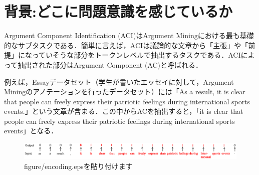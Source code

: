 \documentclass[a4j,fleqn,10pt]{jarticle}
\begin{document}
\setlength{\abovedisplayskip}{-4pt} %
\setlength{\belowdisplayskip}{2pt} %





\maketitle



\section{背景:どこに問題意識を感じているか}
Argument Component Identification (ACI)はArgument Miningにおける最も基礎的なサブタスクである．簡単に言えば，ACIは議論的な文章から「主張」や「前提」になっていそうな部分をトークンレベルで抽出するタスクである\cite{stab2017}．ACIによって抽出された部分はArgument Component (AC)と呼ばれる．

\par
例えば，Essayデータセット\cite{stab2017}（学生が書いたエッセイに対して，Argument Miningのアノテーションを行ったデータセット）には「As a result, it is clear that people can freely express their patriotic feelings during international sports events.」という文章が含まる．この中からACを抽出すると，「it is clear that people can freely express their patriotic feelings during international sports events」となる．

\begin{figure}[t]
\begin{center}
\includegraphics[width=\linewidth]{figure/bio.eps}
\end{center}
\caption{figure/encoding.epsを貼り付けます}
\label{fig:bio}
\end{figure}
\end{document}
